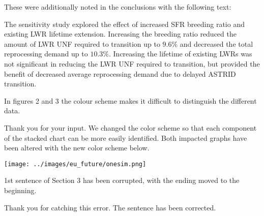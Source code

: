 \documentclass[answers,11pt]{exam}
\begin{document}
\begin{questions}
\begin{solution}
                 These were additionally noted in the conclusions with the 
                 following text: 
                 

The sensitivity study explored the effect of increased \gls{SFR} breeding
ratio and existing \gls{LWR} lifetime extension. Increasing the breeding
ratio reduced the amount of \gls{LWR} \gls{UNF} required to transition
up to $9.6\%$ and decreased the total reprocessing demand up to $10.3\%$.
Increasing the lifetime of existing \glspl{LWR} was not significant
in reducing the \gls{LWR} \gls{UNF} required to transition, but provided the benefit of
decreased average reprocessing demand due to delayed \gls{ASTRID} transition.

        \end{solution}

        \question In figures 2 and 3 the colour scheme makes it difficult to 
        distinguish the different data.
        \begin{solution}
        	Thank you for your input. We changed the color scheme so that
        	each component of the stacked chart can be more easily identified.
                Both impacted graphs have been altered with the new color 
                scheme below.

        	\texttt{[image: ../images/eu\_future/onesim.png]}

        \end{solution}

        \question 1st sentence of Section 3 has been corrupted, with the ending 
        moved to the beginning.

        \begin{solution}
                Thank you for catching this error. The sentence has been corrected.
        \end{solution}


\end{questions}
\end{document}
